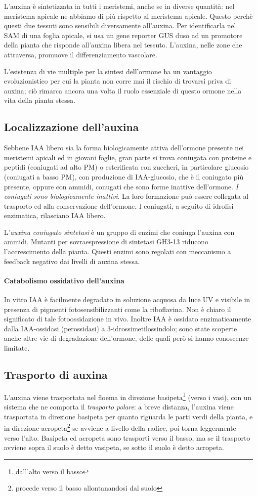 \documentclass[a4paper,12pt]{book}
\begin{document}
L'auxina è sintetizzata in tutti i meristemi, anche se in diverse quantità: nel meristema apicale ne abbiamo di più rispetto al meristema apicale. Questo perchè questi due tessuti sono sensibili diversamente all'auxina.
Per identificarla nel SAM di una foglia apicale, si usa un gene reporter GUS duso ad un promotore della pianta che risponde all'auxina libera nel tessuto. L'auxina, nelle zone che attraversa, promuove il differenziamento vascolare.

L'esistenza di vie multiple per la sintesi dell'ormone
ha un vantaggio evoluzionistico per cui la pianta non
corre mai il rischio di trovarsi priva di auxina; ciò
rimarca ancora una volta il ruolo essenziale di
questo ormone nella vita della pianta stessa.

\subsection{Localizzazione dell'auxina}
Sebbene IAA libero sia la forma biologicamente attiva dell’ormone presente nei meristemi apicali ed in
giovani foglie, gran parte si trova coniugata con proteine e peptidi (coniugati ad alto PM) o esterificata con zuccheri, in particolare glucosio (coniugati a basso PM), con produzione di IAA-glucosio, che è il coniugato più presente, oppure con ammidi, conugati che sono forme inattive dell'ormone.
 \emph{I coniugati
sono biologicamente inattivi}. La loro formazione può essere collegata al trasporto ed alla conservazione
dell’ormone. I coniugati, a seguito di idrolisi enzimatica, rilasciano IAA libero.

L'\emph{auxina coniugato sintetasi} è un gruppo di enzimi che coniuga l'auxina con ammidi. Mutanti per sovraespressione di sintetasi GH3-13 riducono l'accrescimento della pianta. Questi enzimi sono regolati con meccanismo a feedback negativo dai livelli di auxina stessa.

\paragraph{Catabolismo ossidativo dell'auxina} In vitro IAA è facilmente degradato in soluzione acquosa da luce UV e visibile in presenza di pigmenti
fotosensibilizzanti come la riboflavina. Non è chiaro il significato di tale fotoossidazione in vivo. Inoltre IAA
è ossidato enzimaticamente dalla IAA-ossidasi (perossidasi) a 3-idrossimetilossindolo; sono state
scoperte anche altre vie di degradazione dell’ormone, delle quali però si hanno conoscenze limitate.
\subsection{Trasporto di auxina}
L'auxina viene trasportata nel floema in direzione basipeta\footnote{dall'alto verso il basso} (verso i vasi), con un sistema che ne comporta il \emph{trasporto polare}: a breve distanza, l'auxina viene trasportata in direzione basipeta per quanto riguarda le parti verdi della pianta, e in direzione acropeta\footnote{procede verso il basso allontanandosi dal suolo} se avviene a livello della radice, poi torna leggermente verso l'alto. Basipeta ed acropeta sono trasporti verso il basso, ma se il trasporto avviene sopra il suolo è detto vasipeta, se sotto il suolo è detto acropeta.
\end{document}
